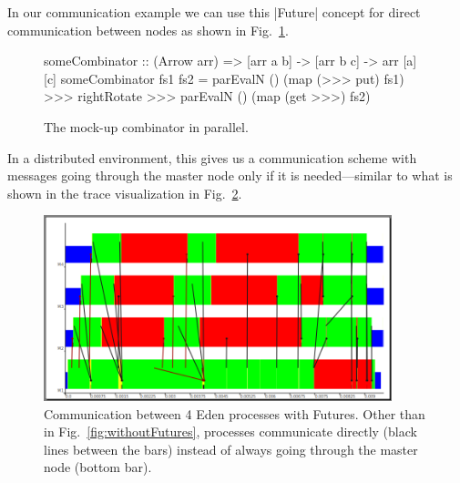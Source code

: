 In our communication example we can use this |Future| concept for direct communication between nodes as shown in Fig.~\ref{fig:someCombinatorParallel}.
\begin{figure}[tbh]
\begin{code}
someCombinator :: (Arrow arr) => [arr a b] -> [arr b c] -> arr [a] [c]
someCombinator fs1 fs2 =
	parEvalN () (map (>>> put) fs1) >>>
	rightRotate >>>
	parEvalN () (map (get >>>) fs2)
\end{code}
\caption{The mock-up combinator in parallel.}
\label{fig:someCombinatorParallel}
\end{figure}
In a distributed environment, this gives us a communication scheme with messages going through the master node only if it is needed---similar to what is shown in the trace visualization in Fig.~\ref{fig:withFutures}. 
\begin{figure}[ht]
	\centering
	\includegraphics[width=0.9\textwidth]{images/withFutures}
	\caption[with Futures]{Communication between 4 Eden processes with Futures. Other than in Fig.~\ref{fig:withoutFutures}, processes communicate directly (black lines between the bars) instead of always going through the master node (bottom bar).}
	\label{fig:withFutures}
\end{figure}
